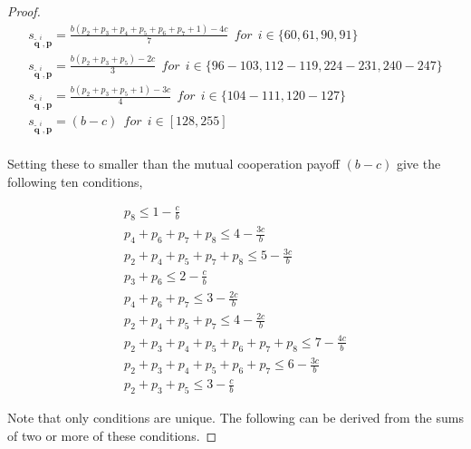 \documentclass{article}
\theoremstyle{definition}
\begin{document}
\begin{proof}
\begin{equation}
\begin{array}{l}
    s_{\mathbf{\tilde{q}}^{i}, \mathbf{p}} = \frac{b \left(p_{2} + p_{3} + p_{4} + p_{5} + p_{6} + p_{7} + 1\right) - 4c}{7} ~~for~~ i \in \{60, 61, 90, 91\} \\ [1em]
    s_{\mathbf{\tilde{q}}^{i}, \mathbf{p}} = \frac{b \left(p_{2} + p_{3} + p_{5}\right) - 2 c}{3} ~~for~~ i \in \{96\!- \!103, 112\!- \!119, 224\!- \!231, 240\!- \!247\} \\ [1em]
    s_{\mathbf{\tilde{q}}^{i}, \mathbf{p}} = \frac{b \left(p_{2} + p_{3} + p_{5} + 1\right) - 3c}{4} ~~for~~ i \in \{104\!-\!111, 120\!- \!127\} \\ [1em]
    s_{\mathbf{\tilde{q}}^{i}, \mathbf{p}} = (b - c) ~~for~~ i \in [128, 255] \\ [1em]
  \end{array}
\end{equation}

Setting these to smaller than the mutual cooperation payoff $(b - c)$ give the
following ten conditions,

\begin{align}
  p_8 \leq 1 \!- \!\frac{c}{b} \\
  p_4 + p_6 + p_7 + p_8 \leq 4 - \frac{3c}{b} \\
  p_{2} + p_{4} + p_{5} + p_{7} + p_{8} \leq 5 - \frac{3 c}{b} \\
  p_{3} + p_{6}\leq2 - \frac{c}{b} \\
  p_{4} + p_{6} + p_{7}\leq3 - \frac{2 c}{b} \\
  p_{2} + p_{4} + p_{5} + p_{7}\leq4 - \frac{2 c}{b} \\
  p_{2} + p_{3} + p_{4} + p_{5} + p_{6} + p_{7} + p_{8}\leq7 - \frac{4 c}{b} \\
  p_{2} + p_{3} + p_{4} + p_{5} + p_{6} + p_{7}\leq6 - \frac{3 c}{b} \\
  p_{2} + p_{3} + p_{5}\leq3 - \frac{c}{b}
\end{align}


Note that only conditions are unique. The following can be derived from the
sums of two or more of these conditions.

\end{proof}



\end{document}
